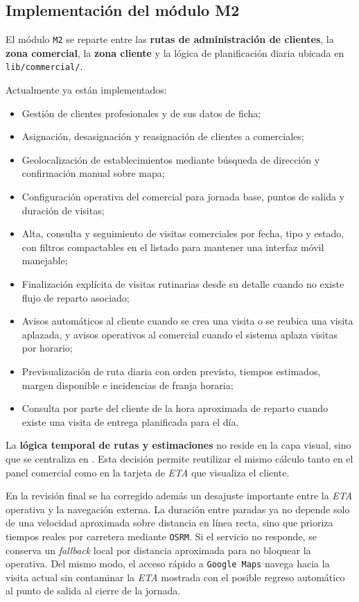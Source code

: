 \subsection{Implementación del módulo M2}

El módulo \texttt{M2} se reparte entre las \textbf{rutas de administración de clientes}, la \textbf{zona comercial}, la \textbf{zona cliente} y la lógica de planificación diaria ubicada en \texttt{lib/commercial/}.

Actualmente ya están implementados:

\begin{itemize}
    \item Gestión de clientes profesionales y de sus datos de ficha;
    \item Asignación, desasignación y reasignación de clientes a comerciales;
    \item Geolocalización de establecimientos mediante búsqueda de dirección y confirmación manual sobre mapa;
    \item Configuración operativa del comercial para jornada base, puntos de salida y duración de visitas;
    \item Alta, consulta y seguimiento de visitas comerciales por fecha, tipo y estado, con filtros compactables en el listado para mantener una interfaz móvil manejable;
    \item Finalización explícita de visitas rutinarias desde su detalle cuando no existe flujo de reparto asociado;
    \item Avisos automáticos al cliente cuando se crea una visita o se reubica una visita aplazada, y avisos operativos al comercial cuando el sistema aplaza visitas por horario;
    \item Previsualización de ruta diaria con orden previsto, tiempos estimados, margen disponible e incidencias de franja horaria;
    \item Consulta por parte del cliente de la hora aproximada de reparto cuando existe una visita de entrega planificada para el día.
\end{itemize}

La \textbf{lógica temporal de rutas y estimaciones} no reside en la capa visual, sino que se centraliza en . Esta decisión permite reutilizar el mismo cálculo tanto en el panel comercial como en la tarjeta de \textit{ETA} que visualiza el cliente.

En la revisión final se ha corregido además un desajuste importante entre la \textit{ETA} operativa y la navegación externa. La duración entre paradas ya no depende solo de una velocidad aproximada sobre distancia en línea recta, sino que prioriza tiempos reales por carretera mediante \texttt{OSRM}. Si el servicio no responde, se conserva un \textit{fallback} local por distancia aproximada para no bloquear la operativa. Del mismo modo, el acceso rápido a \texttt{Google Maps} navega hacia la visita actual sin contaminar la \textit{ETA} mostrada con el posible regreso automático al punto de salida al cierre de la jornada.

